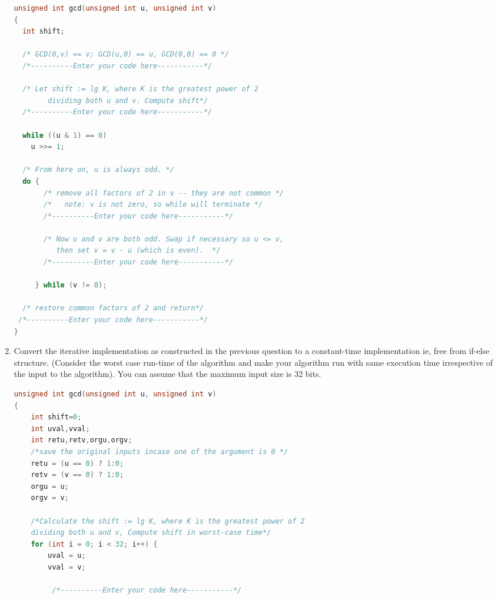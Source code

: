\documentclass{article}
\begin{document}
\begin{questions}
\begin{enumerate}

\begin{lstlisting}[language=C]
unsigned int gcd(unsigned int u, unsigned int v)
{
  int shift;

  /* GCD(0,v) == v; GCD(u,0) == u, GCD(0,0) == 0 */
  /*----------Enter your code here-----------*/
 
  /* Let shift := lg K, where K is the greatest power of 2
        dividing both u and v. Compute shift*/
  /*----------Enter your code here-----------*/
 
  while ((u & 1) == 0)
    u >>= 1;
 
  /* From here on, u is always odd. */
  do {
       /* remove all factors of 2 in v -- they are not common */
       /*   note: v is not zero, so while will terminate */
       /*----------Enter your code here-----------*/

       /* Now u and v are both odd. Swap if necessary so u <= v,
          then set v = v - u (which is even).  */
       /*----------Enter your code here-----------*/
       
     } while (v != 0);

  /* restore common factors of 2 and return*/
 /*----------Enter your code here-----------*/
}

\end{lstlisting}



\item Convert the iterative implementation as constructed in the previous question to a constant-time implementation ie, free from if-else structure. (Consider the worst case run-time of the algorithm and make your algorithm run with same execution time irrespective of the input to the algorithm). 
You can assume that the maximum input size is 32 bits. 


\begin{lstlisting}[language=C]
unsigned int gcd(unsigned int u, unsigned int v)
{
	int shift=0;
	int uval,vval;
	int retu,retv,orgu,orgv;
	/*save the original inputs incase one of the argument is 0 */
	retu = (u == 0) ? 1:0;
	retv = (v == 0) ? 1:0;
	orgu = u;
	orgv = v;
 
	/*Calculate the shift := lg K, where K is the greatest power of 2 
    dividing both u and v, Compute shift in worst-case time*/
	for (int i = 0; i < 32; i++) {
		uval = u;
		vval = v;
         
         /*----------Enter your code here-----------*/
		

\end{lstlisting}
\end{enumerate}
\end{questions}
\end{document}
